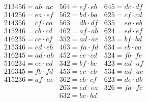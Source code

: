 \documentclass[11pt,a4paper]{book}
\begin{document}
\begin{equation}\tag{B}
\begin{array}{lll}
213456 = ab \cdot ac & 564 = ef \cdot eb & 645 = dc \cdot df \\
314256 = ea \cdot ef & 562 = bd \cdot ba & 625 = cf \cdot cd \\
214356 = cf \cdot ca & 563 = db \cdot df & 635 = ea \cdot eb \\
315246 = cb \cdot cd & 462 = af \cdot ab & 624 = ed \cdot ef \\
416235 = ce \cdot cf & 352 = ad \cdot ae & 523 = bf \cdot bd \\
215346 = ed \cdot eb & 463 = fa \cdot fd & 634 = cb \cdot ca \\
316245 = ad \cdot ab & 452 = ce \cdot cd & 524 = fb \cdot fe \\
516234 = ec \cdot ed & 342 = bf \cdot bc & 423 = ad \cdot af \\
216345 = fb \cdot fd & 453 = ec \cdot eb & 534 = ad \cdot ac \\
415236 = af \cdot ae & 362 = cb \cdot cf & 623 = de \cdot db \\
& 263 = ed \cdot ea & 326 = fa \cdot fc \\
& 632 = bc \cdot bd
\end{array}
\end{equation}
\end{document}
